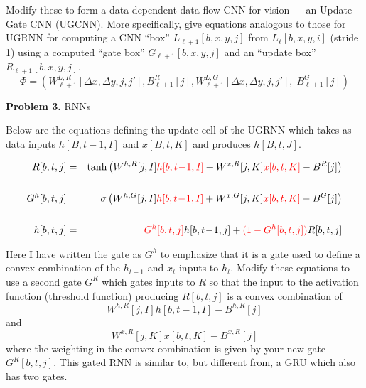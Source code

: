 \documentclass{article}
\newcommand{\solution}[1]{}
\begin{document}
Modify these to form a data-dependent data-flow CNN for vision --- an Update-Gate CNN (UGCNN).
More specifically, give equations analogous to those for UGRNN for computing a CNN ``box'' $L_{\ell+1}[b,x,y,j]$ from $L_\ell[b,x,y,i]$ (stride 1) using a computed ``gate box'' $G_{\ell+1}[b,x,y,j]$ and an ``update box'' $R_{\ell+1}[b,x,y,j]$.
$$\Phi = (W^{L,R}_{\ell+1}[\Delta x, \Delta y,j,j'], B^R_{\ell+1}[j], W^{L,G}_{\ell+1}[\Delta x, \Delta y,j,j'],\;B^G_{\ell+1}[j])$$

\solution{
  \begin{eqnarray*}
    R_{\ell+1}[b,x,y,j] & = & \mathrm{tanh}\left(\left(\sum_{\Delta x,\Delta y,j'}\;W^{L,R}_{\ell+1}[\Delta x, \Delta y, j',j]
    L_{\ell}[b,x+\Delta x,\;y+\Delta y,\;j']\right) - B^R_{\ell+1}[j]\right) \\
    \\
    G_{\ell+1}[b,x,y,j] & = & \sigma\left(\left(\sum_{\Delta x,\Delta y,i}\;W^{L,G}_{\ell+1}[\Delta x, \Delta y, i,j]
    L_{\ell}[b,x+\Delta x,\;y+\Delta y,\;i]\right) - B^G_{\ell+1}[j]\right) \\
    \\
    L_{\ell+1}[b,x,y,j] & = & G_{\ell+1}[b,x,y,j]L_\ell[b,x,y,j] + (1-G_t[b,x,y,j])R_t[b,x,y,j]
  \end{eqnarray*}
}

{\bf Problem 3.} RNNs

Below are the equations defining the update cell of the UGRNN which takes as data inputs $h[B,t-1,I]$ and $x[B,t,K]$ and produces
$h[B,t,J]$.

\begin{eqnarray*}
R[b,t,j] & = & \mathrm{tanh}\left(W^{h,R}[j,I]{\color{red} h[b,t\!-\!1,I]} + W^{x,R}[j,K]{\color{red} x[b,t,K]} - B^R[j]\right) \\
\\
G^h[b,t,j] & = & \sigma\left(W^{h,G}[j,I]{\color{red} h[b,t\!-\!1,I]} + W^{x,G}[j,K]{\color{red} x[b,t,K]} - B^G[j]\right) \\
\\
h[b,t,j] & = & {\color{red} G^h[b,t,j]}h[b,t\!-\!1,j] + {\color{red} (1-G^h[b,t,j])}R[b,t,j]
\end{eqnarray*}

Here I have written the gate as $G^h$ to emphasize that it is a gate used to define a convex combination of the $h_{t-1}$ and $x_t$ inputs to $h_t$. Modify these equations to use a second gate $G^R$
which gates inputs to $R$
so that the input to the activation function (threshold function) producing $R[b,t,j]$ is a convex combination of
$$W^{h,R}[j,I] h[b,t\!-\!1,I] - B^{h,R}[j]$$
and
$$W^{x,R}[j,K] x[b,t,K] - B^{x,R}[j]$$
where the weighting in the convex combination is given by your new gate $G^R[b,t,j]$.
This gated RNN is similar to, but different from, a GRU which also has two gates.
\end{document}
